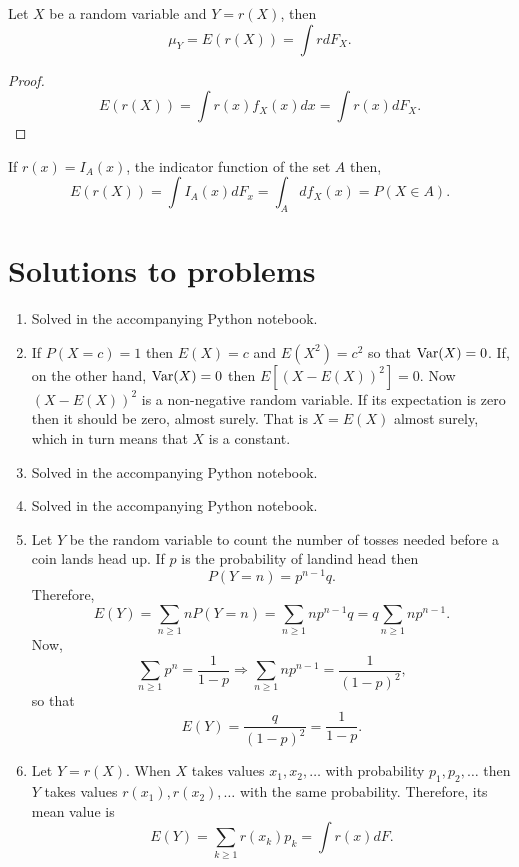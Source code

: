 \documentclass{article}
\begin{document}
\begin{thm}\label{c3t1}
Let $X$ be a random variable and $Y = r(X)$, then 
\[
\mu_Y = E(r(X)) = \int rdF_X.
\]
\end{thm}
\begin{proof}
\[
E(r(X)) = \int r(x)f_X(x)dx = \int r(x)dF_X.
\]
\end{proof}

If $r(x) = I_A(x)$, the indicator function of the set $A$ then,
\[
E(r(X)) = \int I_A(x)dF_x = \int_A df_X(x) = P(X \in A).
\]

\section{Solutions to problems}
\begin{enumerate}
\item Solved in the accompanying Python notebook.

\item If $P(X = c) = 1$ then $E(X) = c$ and $E(X^2) = c^2$ so that $\operatorname{Var}(X) = 0$.
If, on the other hand, $\operatorname{Var}(X) = 0$ then $E[(X - E(X))^2] = 0$. Now
$(X - E(X))^2$ is a non-negative random variable. If its expectation is zero then
it should be zero, almost surely. That is $X = E(X)$ almost surely, which in turn
means that $X$ is a constant.

\item Solved in the accompanying Python notebook.

\item Solved in the accompanying Python notebook.

\item Let $Y$ be the random variable to count the number of tosses needed before
a coin lands head up. If $p$ is the probability of landind head then 
\[
P(Y = n) = p^{n-1}q.
\]
Therefore,
\[
E(Y) = \sum_{n \ge 1}nP(Y = n) = \sum_{n \ge 1}np^{n-1}q = q\sum_{n \ge 1}np^{n-1}.
\]
Now,
\[
\sum_{n \ge 1}p^n = \frac{1}{1-p} \Rightarrow \sum_{n \ge 1}np^{n-1} = \frac{1}{(1 - p)^2},
\]
so that
\[
E(Y) = \frac{q}{(1 - p)^2} = \frac{1}{1 - p}.
\]

\item Let $Y = r(X)$. When $X$ takes values $x_1, x_2, \ldots$ with probability
$p_1, p_2, \ldots$ then $Y$ takes values $r(x_1), r(x_2), \ldots$ with the same 
probability. Therefore, its mean value is
\[
E(Y) = \sum_{k\ge 1}r(x_k)p_k = \int r(x)dF.
\]


\end{enumerate}
\end{document}
